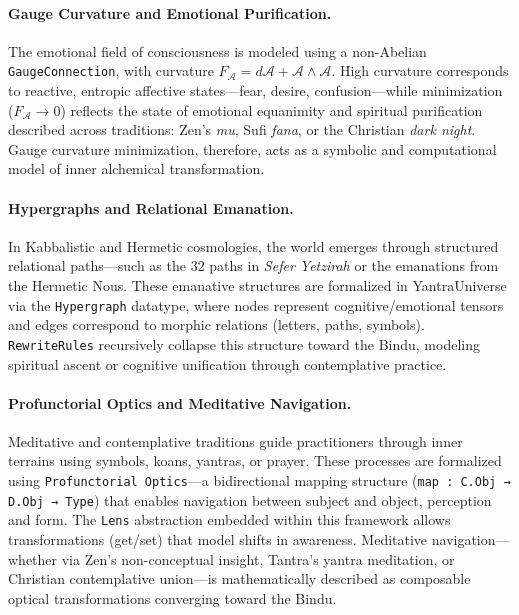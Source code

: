 \documentclass[12pt]{article}
\theoremstyle{plain}
\begin{document}
\paragraph{Gauge Curvature and Emotional Purification.}
The emotional field of consciousness is modeled using a non-Abelian \texttt{GaugeConnection}, with curvature $F_{\mathcal{A}} = d\mathcal{A} + \mathcal{A} \wedge \mathcal{A}$. High curvature corresponds to reactive, entropic affective states—fear, desire, confusion—while minimization ($F_{\mathcal{A}} \to 0$) reflects the state of emotional equanimity and spiritual purification described across traditions: Zen’s \textit{mu}, Sufi \textit{fana}, or the Christian \textit{dark night}. Gauge curvature minimization, therefore, acts as a symbolic and computational model of inner alchemical transformation.

\paragraph{Hypergraphs and Relational Emanation.}
In Kabbalistic and Hermetic cosmologies, the world emerges through structured relational paths—such as the 32 paths in \textit{Sefer Yetzirah} or the emanations from the Hermetic Nous. These emanative structures are formalized in YantraUniverse via the \texttt{Hypergraph} datatype, where nodes represent cognitive/emotional tensors and edges correspond to morphic relations (letters, paths, symbols). \texttt{RewriteRules} recursively collapse this structure toward the Bindu, modeling spiritual ascent or cognitive unification through contemplative practice.

\paragraph{Profunctorial Optics and Meditative Navigation.}
Meditative and contemplative traditions guide practitioners through inner terrains using symbols, koans, yantras, or prayer. These processes are formalized using \texttt{Profunctorial Optics}—a bidirectional mapping structure (\texttt{map : C.Obj → D.Obj → Type}) that enables navigation between subject and object, perception and form. The \texttt{Lens} abstraction embedded within this framework allows transformations (get/set) that model shifts in awareness. Meditative navigation—whether via Zen’s non-conceptual insight, Tantra’s yantra meditation, or Christian contemplative union—is mathematically described as composable optical transformations converging toward the Bindu.
\end{document}
